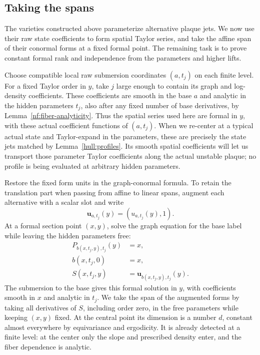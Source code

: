 \subsection{Taking the spans}

The varieties constructed above parameterize alternative plaque jets.
We now use their raw state coefficients to form spatial Taylor series,
and take the affine span of their conormal forms at a fixed formal point.
The remaining task is to prove constant formal rank and independence
from the parameters and higher lifts.

Choose compatible local raw submersion coordinates $(a,t_j)$ on each
finite level. For a fixed Taylor order in $y$, take $j$ large enough to
contain its graph and log-density coefficients. These coefficients are
smooth in the base $a$ and analytic in the hidden
parameters $t_j$, also after any fixed number of base derivatives, by
Lemma~\ref{nf:fiber-analyticity}. Thus the spatial series used here are
formal in $y$, with these actual coefficient functions of $(a,t_j)$.
When we re-center at a typical actual state and Taylor-expand in the
parameters, these are precisely the state jets matched by
Lemma~\ref{hull:profiles}. Its smooth spatial coefficients will let us
transport those parameter Taylor coefficients along the actual unstable
plaque; no profile is being evaluated at arbitrary hidden parameters.

Restore the fixed form units in the graph-conormal formula. To retain
the translation part when passing from affine to linear spans, augment
each alternative with a scalar slot and write
\[
 \mathbf u_{a,t_j}(y)=(u_{a,t_j}(y),1).
\]
At a formal section point $(x,y)$, solve the graph equation for the base
label while leaving the hidden parameters free:
\begin{equation}\label{hull:point-constraint}
 \begin{split}
 P_{b(x,t_j,y),t_j}(y)&=x,\\
 b(x,t_j,0)&=x,\\
 S(x,t_j,y)&=\mathbf u_{b(x,t_j,y),t_j}(y).
 \end{split}
\end{equation}
The submersion to the base gives this formal solution in $y$, with
coefficients smooth in $x$ and analytic in $t_j$. We take the span of
the augmented forms by taking all derivatives of $S$, including order
zero, in the free parameters while keeping $(x,y)$ fixed. At the central
point its dimension is a number $d$, constant almost everywhere by
equivariance and ergodicity. It is already detected at a finite level:
at the center only the slope and prescribed density enter, and the
fiber dependence is analytic.

